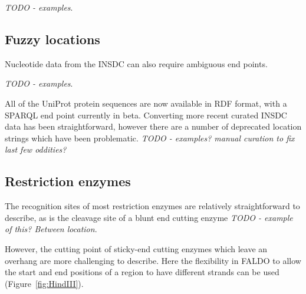 \textit{TODO - examples}.

\subsection*{Fuzzy locations}
Nucleotide data from the INSDC can also require ambiguous end points.

\textit{TODO - examples}.

All of the UniProt protein sequences are now available in RDF format,
with a SPARQL end point currently in beta. Converting more recent
curated INSDC data has been straightforward, however there are a
number of deprecated location strings which have been problematic.
\textit{TODO - examples? manual curation to fix last few oddities?}

\subsection*{Restriction enzymes}

The recognition sites of most restriction enzymes are relatively
straightforward to describe, as is the cleavage site of a blunt
end cutting enzyme \textit{TODO - example of this? Between location}.

However, the cutting point of sticky-end cutting enzymes which
leave an overhang are more challenging to describe. Here the
flexibility in FALDO to allow the start and end positions of a region
to have different strands can be used (Figure~\ref{fig:HindIII}).

